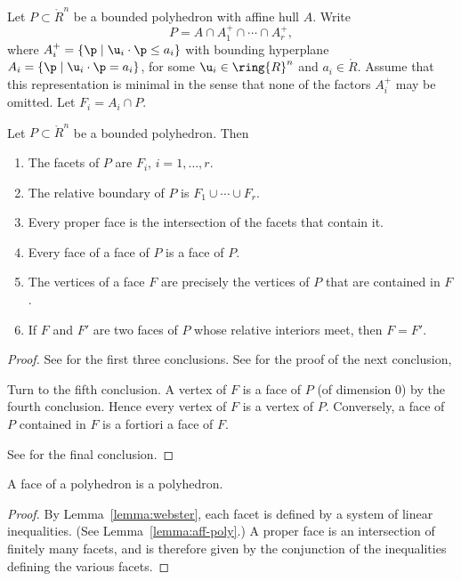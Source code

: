 Let $P\subset\ring{R}^n$ be a bounded polyhedron with affine hull $A$. Write 
$$
P = A \cap A^+_1 \cap \cdots \cap A^+_r,
$$
where
$A^+_i = \{\p\mid \u_i\cdot \p \le a_i\}$ with bounding hyperplane
$A_i=\{\p\mid \u_i \cdot \p = a_i\}$, for some $\u_i\in \ring{R}^n$ and $a_i\in\ring{R}$. 
Assume that this representation is minimal in the sense that none of the factors $A^+_i$ may be omitted.  Let $F_i = A_i\cap P$.
%


\begin{lemma}\label{lemma:webster}  
Let $P\subset\ring{R}^n$ be a bounded polyhedron.  Then
%
\begin{enumerate}
\item The facets of $P$ are $F_i$, $i=1,\ldots,r$.
\item The relative boundary of $P$ is $F_1\cup\cdots \cup F_r$.
\item Every proper face is the intersection of the facets that contain it.
\item Every face of a face of $P$ is a face of $P$.
\item The vertices of a face $F$ are precisely the vertices of $P$ that are contained in $F$.
\item If $F$ and $F'$ are two faces of $P$ whose relative interiors meet, then
$F=F'$.
\end{enumerate}
\end{lemma}
%
%
%

\begin{proof} See \cite[Thm~3.2.1]{webster:1994} for the first three conclusions.
See \cite[Th~2.6.5]{webster:1994} for the proof of the next conclusion,

Turn to the fifth conclusion.  A vertex of $F$ is a face of $P$ (of dimension $0$) by the fourth conclusion.  Hence every vertex of $F$ is a vertex of $P$.  Conversely, a face of $P$ contained in $F$ is a fortiori a face of $F$.

See \cite[Cor~2.6.7]{webster:1994} for the final conclusion.
\end{proof}

\begin{corollary}
A face of a polyhedron is a polyhedron.  
\end{corollary}

\begin{proof} By Lemma~\ref{lemma:webster}, each facet is defined by a system of linear inequalities.  (See Lemma~\ref{lemma:aff-poly}.)  A proper face is an intersection of finitely many facets, and is therefore given by the conjunction of the inequalities defining the various facets.
\end{proof}


